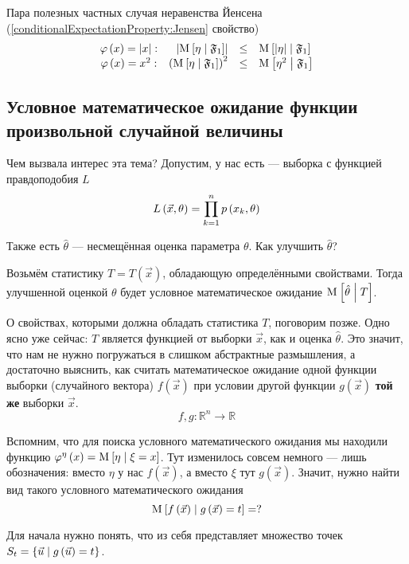 Пара полезных частных случая неравенства Йенсена
(\ref{conditionalExpectationProperty:Jensen} свойство)
$$\begin{array}{crcl}
  \varphi\left( x \right) = \left|x\right|:&
      \left| \operatorname{M}_{} \left[ \eta \;\middle|\; \mathfrak{F}_1 \right] \right|
      &\le& \operatorname{M}_{} \left[ \left| \eta \right| \;\middle|\; \mathfrak{F}_1 \right] \\
  \varphi\left( x \right) = x^2:&
      \left( \operatorname{M}_{} \left[ \eta \;\middle|\; \mathfrak{F}_1 \right] \right)^2
      &\le& \operatorname{M}_{} \left[ \eta^2 \;\middle|\; \mathfrak{F}_1 \right]
\end{array}$$

\subsection{Условное математическое ожидание функции
  произвольной случайной величины}\label{conditionalExpectationSubsection}

Чем вызвала интерес эта тема?
Допустим, у нас есть \xsample --- выборка с функцией правдоподобия $L$
$$L\left( \vec{x}, \theta \right) = \prod_{k=1}^n p\left(x_k, \theta\right)$$

Также есть $\hat{\theta}$ --- несмещённая оценка параметра $\theta$.
Как улучшить $\hat{\theta}$?

Возьмём статистику $T = T\left( \vec{x} \right)$,
обладающую определёнными свойствами.
Тогда улучшенной оценкой $\theta$ будет условное математическое ожидание
$\operatorname{M}_{} \left[  \hat{\theta} \;\middle|\; T  \right]$.

О свойствах, которыми должна обладать статистика $T$, поговорим позже.
Одно ясно уже сейчас: $T$ является функцией от выборки $\vec{x}$,
как и оценка $\hat{\theta}$.
Это значит, что нам не нужно погружаться в слишком абстрактные размышления,
а достаточно выяснить, как считать математическое ожидание
одной функции выборки (случайного вектора) $f\left( \vec{x} \right)$
при условии другой функции $g\left( \vec{x} \right)$
\textbf{той же} выборки $\vec{x}$.
$$f,g: \mathbb{R}^n \rightarrow \mathbb{R}$$

Вспомним, что для поиска условного математического ожидания
мы находили функцию
$\varphi^{\eta}\left( x \right) = \operatorname{M}_{} \left[  \eta \;\middle|\; \xi = x  \right]$.
Тут изменилось совсем немного --- лишь обозначения:
вместо $\eta$ у нас $f\left( \vec{x} \right)$,
а вместо $\xi$ тут $g\left( \vec{x} \right)$.
Значит, нужно найти вид такого условного математического ожидания
$$\operatorname{M}_{} \left[ f\left( \vec{x} \right) \;\middle|\; g\left( \vec{x} \right) = t \right] = ?$$

Для начала нужно понять, что из себя представляет множество точек
$S_t = \left\{ \vec{u} \;\middle|\; g\left( \vec{u} \right) = t \right\}$.

